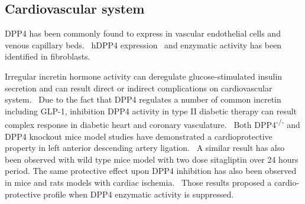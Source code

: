 \subsection{Cardiovascular system}
DPP4 has been commonly found to express in vascular endothelial cells and venous capillary beds.~\cite{Matheeussen2013,Shigeta2012} hDPP4 expression~\cite{Nemoto1999} and enzymatic activity has been identified in fibroblasts.~\cite{Ospelt2010}
\par 
Irregular incretin hormone activity can deregulate glucose-stimulated insulin secretion and can result direct or indirect complications on cardiovascular system.~\cite{Ussher2012} Due to the fact that DPP4 regulates a number of common incretin including GLP-1, inhibition DPP4 activity in type II diabetic therapy can result complex response in diabetic heart and coronary vasculature.~\cite{Ussher2014} Both DPP4\textsuperscript{-/-} and DPP4 knockout mice model studies have demonstrated a cardioprotective property in left anterior descending artery ligation.~\cite{Sauvé2010} A similar result has also been observed with wild type mice model with two dose sitagliptin over 24 hours period. The same protective effect upon DPP4 inhibition has also been observed in mice and rats models with cardiac ischemia.~\cite{Ussher2012} Those results proposed a cardio-protective profile when DPP4 enzymatic activity is suppressed. 

